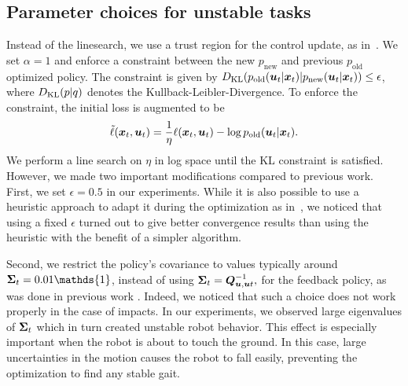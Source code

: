 \subsection{Parameter choices for unstable tasks}
Instead of the linesearch, we use a trust region for the control update, as in~\cite{levine2015learning}.
We set $\alpha = 1$ and enforce a constraint between the new $p_\text{new}$ and previous $p_\text{old}$ optimized policy. The constraint is given by $D_{\mathrm{KL}}(p_\text{old}(\bm{u}_{t}|\bm{x}_{t})|p_\text{new}(\bm{u}_{t}|\bm{x}_{t})) \leq \epsilon$, where $D_{\mathrm{KL}}(p|q)$ denotes the Kullback-Leibler-Divergence. To enforce the constraint, the initial loss is augmented to be
%
\begin{align}
\tilde{\ell}(\bm{x}_{t}, \bm{u}_{t}) = \frac{1}{\eta}\ell(\bm{x}_{t}, \bm{u}_{t}) - \log p_\text{old}(\bm{u}_{t}|\bm{x}_{t}).
\end{align}
%
We perform a line search on $\eta$ in log space until the KL constraint is satisfied.
%
However, we made two important modifications compared to previous work.
First, we set $\epsilon = 0.5$ in our experiments. While it is also possible to use a heuristic
approach to adapt it during the optimization as in~\cite{levine2016end}, we noticed that
using a fixed $\epsilon$ turned out to give better
convergence results than using the heuristic with the benefit of a simpler algorithm.

Second, we restrict the policy's covariance to values typically around $\b{\Sigma}_t=0.01\mathds{1}$, instead of
using $\bm{\Sigma}_t=\bm{Q}^{-1}_{\bm{u},\bm{u}t},$ for the feedback policy, as was done in previous work \cite{levine2015learning}.
Indeed, we noticed that such a choice does not work properly in the case of impacts. In our experiments, we observed large eigenvalues of $\bm{\Sigma}_t$ which  in turn created unstable robot behavior.
This effect is especially important when the robot is about to touch the ground. In this case, large uncertainties in the motion causes the robot to fall easily, preventing the optimization to find any stable gait.
%

